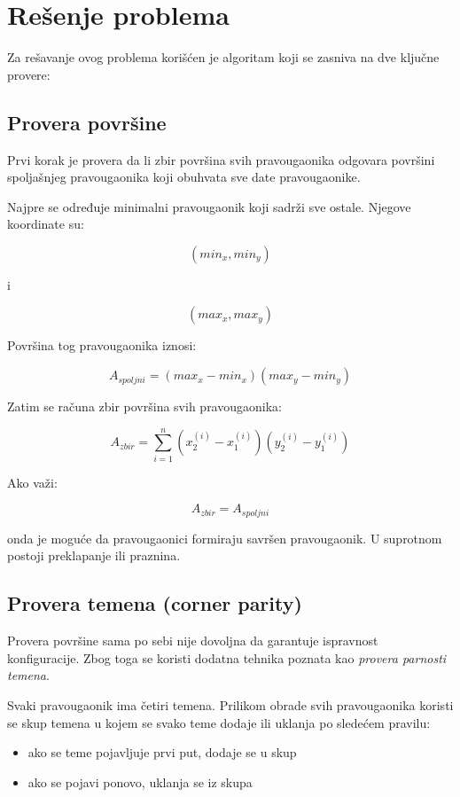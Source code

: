 \documentclass[11pt,a4paper]{article}
\begin{document}
\section{Rešenje problema}

Za rešavanje ovog problema korišćen je algoritam koji se zasniva na dve ključne provere:

\subsection{Provera površine}

Prvi korak je provera da li zbir površina svih pravougaonika odgovara površini spoljašnjeg pravougaonika koji obuhvata sve date pravougaonike.

Najpre se određuje minimalni pravougaonik koji sadrži sve ostale. Njegove koordinate su:

\[
(min_x, min_y)
\]

i

\[
(max_x, max_y)
\]

Površina tog pravougaonika iznosi:

\[
A_{spoljni} = (max_x - min_x)(max_y - min_y)
\]

Zatim se računa zbir površina svih pravougaonika:

\[
A_{zbir} = \sum_{i=1}^{n} (x_2^{(i)} - x_1^{(i)})(y_2^{(i)} - y_1^{(i)})
\]

Ako važi:

\[
A_{zbir} = A_{spoljni}
\]

onda je moguće da pravougaonici formiraju savršen pravougaonik. 
U suprotnom postoji preklapanje ili praznina.

\subsection{Provera temena (corner parity)}

Provera površine sama po sebi nije dovoljna da garantuje ispravnost konfiguracije. 
Zbog toga se koristi dodatna tehnika poznata kao \textit{provera parnosti temena}.

Svaki pravougaonik ima četiri temena. 
Prilikom obrade svih pravougaonika koristi se skup temena u kojem se svako teme dodaje ili uklanja po sledećem pravilu:

\begin{itemize}
\item ako se teme pojavljuje prvi put, dodaje se u skup
\item ako se pojavi ponovo, uklanja se iz skupa
\end{itemize}
\end{document}
